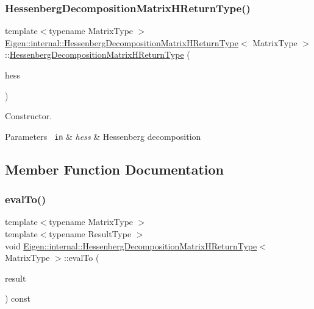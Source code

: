 \subsubsection{\texorpdfstring{HessenbergDecompositionMatrixHReturnType()}{HessenbergDecompositionMatrixHReturnType()}}
{\footnotesize\ttfamily template$<$typename Matrix\+Type $>$ \\
\mbox{\hyperlink{struct_eigen_1_1internal_1_1_hessenberg_decomposition_matrix_h_return_type}{Eigen\+::internal\+::\+Hessenberg\+Decomposition\+Matrix\+H\+Return\+Type}}$<$ Matrix\+Type $>$\+::\mbox{\hyperlink{struct_eigen_1_1internal_1_1_hessenberg_decomposition_matrix_h_return_type}{Hessenberg\+Decomposition\+Matrix\+H\+Return\+Type}} (\begin{DoxyParamCaption}\item[{const \mbox{\hyperlink{class_eigen_1_1_hessenberg_decomposition}{Hessenberg\+Decomposition}}$<$ Matrix\+Type $>$ \&}]{hess }\end{DoxyParamCaption})\hspace{0.3cm}{\ttfamily [inline]}}



Constructor. 


\begin{DoxyParams}[1]{Parameters}
\mbox{\texttt{ in}}  & {\em hess} & Hessenberg decomposition \\
\hline
\end{DoxyParams}


\subsection{Member Function Documentation}
\mbox{\label{struct_eigen_1_1internal_1_1_hessenberg_decomposition_matrix_h_return_type_a7f1d84113072d2d2e507d3821ff9f15c}} 
\subsubsection{\texorpdfstring{evalTo()}{evalTo()}}
{\footnotesize\ttfamily template$<$typename Matrix\+Type $>$ \\
template$<$typename Result\+Type $>$ \\
void \mbox{\hyperlink{struct_eigen_1_1internal_1_1_hessenberg_decomposition_matrix_h_return_type}{Eigen\+::internal\+::\+Hessenberg\+Decomposition\+Matrix\+H\+Return\+Type}}$<$ Matrix\+Type $>$\+::eval\+To (\begin{DoxyParamCaption}\item[{Result\+Type \&}]{result }\end{DoxyParamCaption}) const\hspace{0.3cm}{\ttfamily [inline]}}



